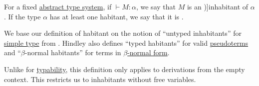 \begin{definition}\label{def:type_habitance}
  For a fixed \hyperref[def:abstract_type_system]{abstract type system}, if \( {}\vdash M: \alpha \), we say that \( M \) is an \term[en=untyped inhabitant (\cite[8A1]{Hindley1997STT})]{inhabitant} of \( \alpha \). If the type \( \alpha \) has at least one habitant, we say that it is .
\end{definition}
\begin{comments}
  \item We base our definition of habitant on the notion of \enquote{untyped inhabitants} for \hyperref[def:simple_type]{simple type} from \cite[def. 8A1]{Hindley1997STT}. Hindley also defines \enquote{typed habitants} for valid \hyperref[def:pseudoterm]{pseudoterms} and \enquote{\( \beta \)-normal habitants} for terms in \hyperref[def:lambda_reduction_normal_form]{\( \beta \)-normal form}.

  \item Unlike for \hyperref[def:typability]{typability}, this definition only applies to derivations from the empty context. This restricts us to inhabitants without free variables.
\end{comments}


